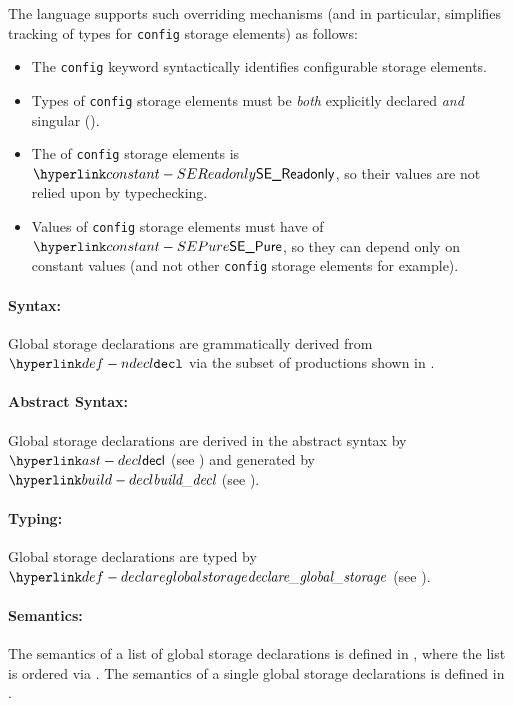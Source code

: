 The language supports such overriding mechanisms (and in particular, simplifies tracking of types for \texttt{config} storage elements) as follows:
\begin{itemize}
  \item The \texttt{config} keyword syntactically identifies configurable storage elements.
  \item Types of \texttt{config} storage elements must be \emph{both} explicitly declared \emph{and} singular ().
  \item The \purity{} of \texttt{config} storage elements is $\SEReadonly$, so their values are not relied upon by typechecking.
  \item Values of \texttt{config} storage elements must have \purity{} of $\SEPure$, so they can depend only on constant values (and not other \texttt{config} storage elements for example).
\end{itemize}

\paragraph{Syntax:} Global storage declarations are grammatically derived from $\Ndecl$
  via the subset of productions shown in .

\paragraph{Abstract Syntax:} Global storage declarations are derived in the abstract syntax by $\decl$
  (see ) and generated by $\builddecl$ (see ).

\paragraph{Typing:} Global storage declarations are typed by $\declareglobalstorage$
(see ).

\paragraph{Semantics:} The semantics of a list of global storage declarations is defined in ,
  where the list is ordered via .
  The semantics of a single global storage declarations is defined in .

